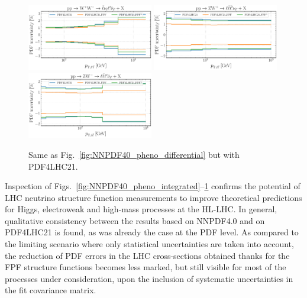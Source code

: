 \begin{figure}[htbp]
	\includegraphics[width=0.49\textwidth]{plots/LHCpheno/NNPDF_WPWM_14TEV_40_PHENO-global-pdf4lhc21.pdf}
	\includegraphics[width=0.49\textwidth]{plots/LHCpheno/NNPDF_WPZ_14TEV_40_PHENO-global-pdf4lhc21.pdf}
	\includegraphics[width=0.49\textwidth]{plots/LHCpheno/NNPDF_WMZ_14TEV_40_PHENO-global-pdf4lhc21.pdf}
	\caption{
		Same as Fig.~\ref{fig:NNPDF40_pheno_differential} but with PDF4LHC21.
	}
	\label{fig:PDF4LHC21_pheno_differential}
\end{figure}

Inspection of Figs.~\ref{fig:NNPDF40_pheno_integrated}--\ref{fig:PDF4LHC21_pheno_differential}
confirms the potential of LHC neutrino structure function measurements
to improve theoretical predictions for Higgs, electroweak and high-mass
processes at the HL-LHC.
%
In general, qualitative consistency between the results based on NNPDF4.0
and on PDF4LHC21 is found, as was already the case at the PDF level.
%
As  compared to the limiting scenario where only statistical uncertainties
are taken into account, the reduction of PDF errors in the LHC cross-sections
obtained thanks for the FPF structure functions becomes less marked,
but still visible for most of the processes under consideration,
upon the inclusion of systematic uncertainties in the fit covariance matrix.


